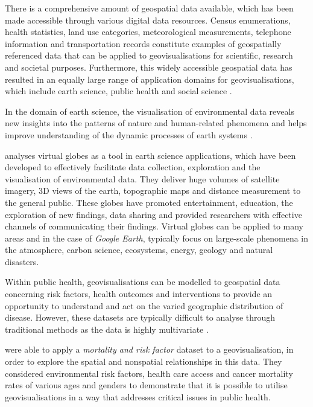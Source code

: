 \documentclass[
	fontsize=11pt
	headlines=2,
	footlines=2,
	parskip=half
]{scrartcl}
\begin{document}
{{			%

			There is a comprehensive amount of geospatial data available, which has been made accessible through various digital data resources. Census enumerations, health statistics, land use categories, meteorological measurements, telephone information and transportation records constitute examples of geospatially referenced data that can be applied to geovisualisations for scientific, research and societal purposes. Furthermore, this widely accessible geospatial data has resulted in an equally large range of application domains for geovisualisations, which include earth science, public health and social science \parencite{maceachren2004geovisualization}.


			In the domain of earth science, the visualisation of environmental data reveals new insights into the patterns of nature and human-related phenomena and helps improve understanding of the dynamic processes of earth systems \parencite{yu2012google}.

			\textcite{yu2012google} analyses virtual globes as a tool in earth science applications, which have been developed to effectively facilitate data collection, exploration and the visualisation of environmental data. They deliver huge volumes of satellite imagery, 3D views of the earth, topographic maps and distance measurement to the general public. These globes have promoted entertainment, education, the exploration of new findings, data sharing and provided researchers with effective channels of communicating their findings. Virtual globes can be applied to many areas and in the case of \emph{Google Earth}, typically focus on large-scale phenomena in the atmosphere, carbon science, ecosystems, energy, geology and natural disasters.

			Within public health, geovisualisations can be modelled to geospatial data concerning risk factors, health outcomes and interventions to provide an opportunity to understand and act on the varied geographic distribution of disease. However, these datasets are typically difficult to analyse through traditional methods as the data is highly multivariate \parencite{maceachren2004geovisualization}.

			\textcite{maceachren2004geovisualization} were able to apply a \emph{mortality and risk factor} dataset to a geovisualisation, in order to explore the spatial and nonspatial relationships in this data. They considered environmental risk factors, health care access and cancer mortality rates of various ages and genders to demonstrate that it is possible to utilise geovisualisations in a way that addresses critical issues in public health.

}}
\end{document}
